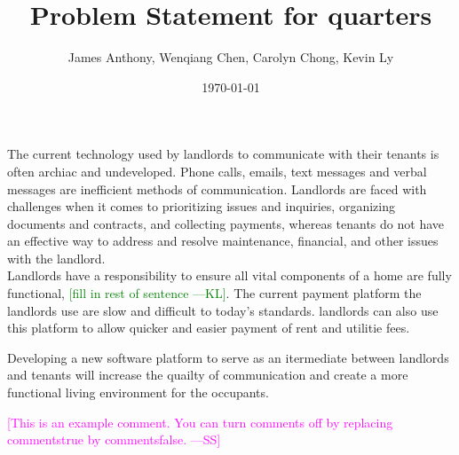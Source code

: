 \documentclass[12pt]{article}
\newcommand{\authornote}[3]{\textcolor{#1}{[#3 ---#2]}}
\newcommand{\authornote}[3]{}
\newcommand{\wss}[1]{\authornote{magenta}{SS}{#1}}
\newcommand{\kly}[1]{\authornote{green}{KL}{#1}}
\begin{document}
\title{Problem Statement for quarters} 
\author{James Anthony, Wenqiang Chen, Carolyn Chong, Kevin Ly}
\date{\today}
	
\maketitle

The current technology used by landlords to communicate with their tenants is 
often archiac and undeveloped. Phone calls, emails, text messages and verbal 
messages are inefficient methods of communication. Landlords are faced with 
challenges when it comes to prioritizing issues and inquiries, organizing 
documents and contracts, and collecting payments, whereas tenants do not have 
an effective way to address and resolve maintenance, financial, and other 
issues with the landlord. \\

Landlords have a responsibility to ensure all vital components of a home are 
fully functional, \kly{fill in rest of sentence}.
The current payment platform the landlords use are slow and difficult to today's standards.
landlords can also use this platform to allow quicker and easier payment of 
rent and utilitie fees. 

Developing a new software platform to serve as an itermediate between 
landlords and tenants will increase the quailty of communication 
and create a more functional living environment for the occupants.

\wss{This is an example comment.  You can turn comments off by replacing
  commentstrue by commentsfalse.}
\end{document}
